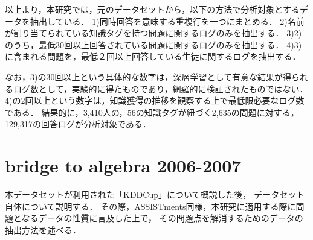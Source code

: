 以上より，本研究では，元のデータセットから，以下の方法で分析対象とするデータを抽出している．
1)同時回答を意味する重複行を一つにまとめる．
2)名前が割り当てられている知識タグを持つ問題に関するログのみを抽出する．
3)2)のうち，最低30回以上回答されている問題に関するログのみを抽出する．
4)3)に含まれる問題を，最低２回以上回答している生徒に関するログを抽出する．

なお，3)の30回以上という具体的な数字は，深層学習として有意な結果が得られるログ数として，実験的に得たものであり，網羅的に検証されたものではない．
4)の2回以上という数字は，知識獲得の推移を観察する上で最低限必要なログ数である．
結果的に，3,410人の，56の知識タグが紐づく2,635の問題に対する，129,317の回答ログが分析対象である．

\begin{figure}[t]
\begin{center}
\hspace*{-40pt}
\end{center}
\end{figure}


\section{bridge to algebra 2006-2007}
本データセットが利用された「KDDCup」について概説した後，
データセット自体について説明する．
その際，ASSISTments同様，本研究に適用する際に問題となるデータの性質に言及した上で，
その問題点を解消するためのデータの抽出方法を述べる．


